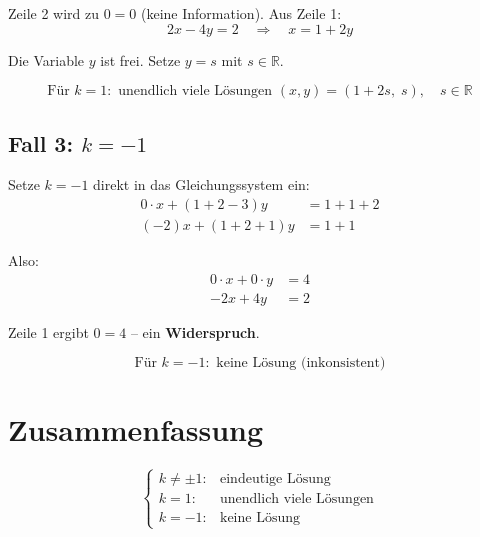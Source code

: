 \documentclass[a4paper,12pt]{article}
\begin{document}
Zeile 2 wird zu $0 = 0$ (keine Information). Aus Zeile 1:
\[
2x - 4y = 2 \quad \Rightarrow \quad x = 1 + 2y
\]

Die Variable $y$ ist frei. Setze $y = s$ mit $s \in \mathbb{R}$.

\[
\boxed{\text{Für } k = 1: \text{ unendlich viele Lösungen } (x, y) = (1 + 2s,\; s), \quad s \in \mathbb{R}}
\]

\subsection*{Fall 3: $k = -1$}

Setze $k = -1$ direkt in das Gleichungssystem ein:
\begin{align*}
0 \cdot x + (1+2-3)y &= 1+1+2 \\
(-2)x + (1+2+1)y &= 1+1
\end{align*}

Also:
\begin{align*}
0 \cdot x + 0 \cdot y &= 4 \\
-2x + 4y &= 2
\end{align*}

Zeile 1 ergibt $0 = 4$ -- ein \textbf{Widerspruch}.

\[
\boxed{\text{Für } k = -1: \text{ keine Lösung (inkonsistent)}}
\]

\section*{Zusammenfassung}

\[
\begin{cases}
k \neq \pm 1: & \text{eindeutige Lösung} \\
k = 1: & \text{unendlich viele Lösungen} \\
k = -1: & \text{keine Lösung}
\end{cases}
\]
\end{document}
